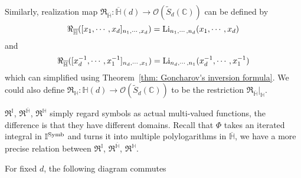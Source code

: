 \begin{definition}
Similarly, realization map $\Re_{\overline{\mathbb H}}:\overline{\mathbb H}(d)\to\mathcal O(\tilde S_d(\mathbb C))$ can be defined by
\begin{equation}
\Re_{\overline{\mathbb H}}([x_1,\cdots,x_d]_{n_1,\cdots,x_d})=\operatorname{Li}_{n_1,\cdots,n_d}(x_1,\cdots,x_d)
\end{equation}
and
\begin{equation}
\Re_{\overline{\mathbb H}}([x_d^{-1},\cdots,x_1^{-1}]_{n_d,\cdots,x_1})=\operatorname{Li}_{n_d,\cdots,n_1}(x_d^{-1},\cdots,x_1^{-1})
\end{equation}
which can simplified using Theorem~\ref{thm: Goncharov's inversion formula}. We could also define $\Re_{\mathbb H}:\mathbb H(d)\to\mathcal O(\tilde S_d(\mathbb C))$ to be the restriction $\Re_{\overline{\mathbb H}}|_{\mathbb H}$.
\end{definition}

$\Re^{\mathbb I}$, $\Re^{\overline{\mathbb H}}$, $\Re^{\mathbb H}$ simply regard symbols as actual multi-valued functions, the difference is that they have different domains. Recall that $\Phi$ takes an iterated integral in $\mathbb I^{\operatorname{Symb}}$ and turns it into multiple polylogarithms in $\overline{\mathbb H}$, we have a more precise relation between $\Re^{\mathbb I}$, $\Re^{\overline{\mathbb H}}$, $\Re^{\mathbb H}$.

\begin{proposition}
For fixed $d$, the following diagram commutes
\begin{center}
\end{center}
\end{proposition}

